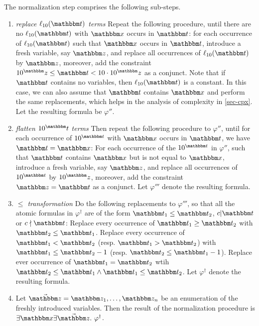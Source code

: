 The normalization step comprises the following sub-steps.
\begin{enumerate}

\item \textit{replace $\ell_{10}(\iterm)$ terms} Repeat the following procedure, until there are no $\ell_{10}(\iterm)$ with $\ivarx$ occurs in $\iterm$: for each occurrence of $\ell_{10}(\iterm)$ such that $\ivarx$ occurs in $\iterm$, introduce a fresh variable, say $\ivarz$, and replace all occurrences of $\ell_{10}(\iterm)$ by $\ivarz$, moreover, add the constraint $10^\ivarz \le \iterm < 10\cdot 10^\ivarz$ as a conjunct. Note that if $\iterm$ contains no variables, then $\ell_{10}(\iterm)$ is a constant. In this case, we can also assume that $\iterm$ contains $\ivarx$ and perform the same replacements, which helps in the analysis of complexity in \ref{sec-cpx}. Let the resulting formula be $\varphi''$.
%

\item \textit{flatten $10^\iterm$ terms} Then repeat the following procedure to $\varphi''$, until for each occurrence of $10^{\iterm}$ with $\ivarx$ occurs in $\iterm$, we have $\iterm = \ivarx$: For each occurrence of the $10^{\iterm}$ in $\varphi''$, such that $\iterm$ contains $\ivarx$ but is not equal to $\ivarx$, introduce a fresh variable, say $\ivarz$, and replace all occurrences of $10^{\iterm}$ by $10^\ivarz$, moreover, add the constraint $\ivarz = \iterm$ as a conjunct. Let $\varphi'''$ denote the resulting formula.  

\item \textit{$\le$ transformation} Do the following replacements to $\varphi'''$, so that all the atomic formulas in $\varphi^\dag$ are of the form $\iterm_1 \le \iterm_2$, $c \vert  \iterm$ or $c \nmid \iterm$: Replace every occurrence of $\iterm_1 \ge \iterm_2$ with $\iterm_2 \le \iterm_1$. Replace every occurrence of $\iterm_1 < \iterm_2$ (resp. $\iterm_1 > \iterm_2$) with $\iterm_1 \le \iterm_2 - 1$ (resp. $\iterm_2 \le \iterm_1-1$). Replace ever occurrence of $\iterm_1 = \iterm_2$ wtih $\iterm_2 \le \iterm_1 \wedge \iterm_1 \le \iterm_2$. Let $\varphi^\dag$ denote the resulting formula. 

\item Let $\vec{\ivarz} = \ivarz_1,\ldots, \ivarz_n$ be an enumeration of the freshly introduced variables. Then the result of the normalization procedure is 
$\exists \ivarx\exists \vec{\ivarz}.\ \varphi^\dag$.
\end{enumerate}

